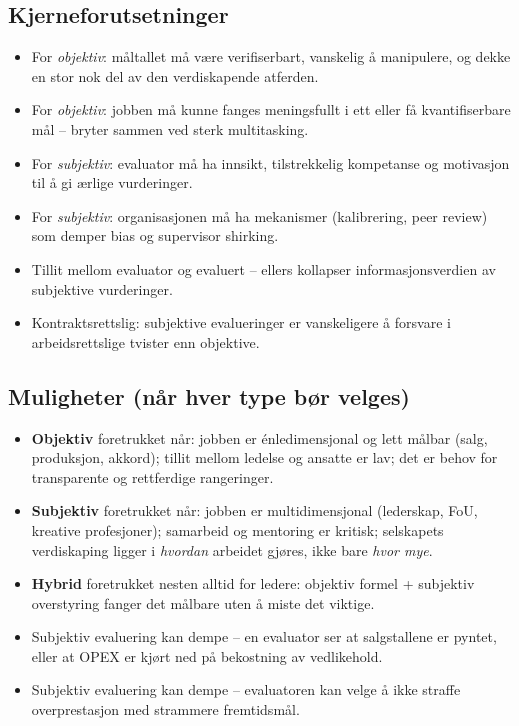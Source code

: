 \subsection*{Kjerneforutsetninger}
\begin{itemize}
\item For \emph{objektiv}: måltallet må være verifiserbart, vanskelig å manipulere, og dekke en stor nok del av den verdiskapende atferden.
\item For \emph{objektiv}: jobben må kunne fanges meningsfullt i ett eller få kvantifiserbare mål -- bryter sammen ved sterk multitasking.
\item For \emph{subjektiv}: evaluator må ha innsikt, tilstrekkelig kompetanse og motivasjon til å gi ærlige vurderinger.
\item For \emph{subjektiv}: organisasjonen må ha mekanismer (kalibrering, peer review) som demper bias og supervisor shirking.
\item Tillit mellom evaluator og evaluert -- ellers kollapser informasjonsverdien av subjektive vurderinger.
\item Kontraktsrettslig: subjektive evalueringer er vanskeligere å forsvare i arbeidsrettslige tvister enn objektive.
\end{itemize}

\subsection*{Muligheter (når hver type bør velges)}
\begin{itemize}
\item \textbf{Objektiv} foretrukket når: jobben er énledimensjonal og lett målbar (salg, produksjon, akkord); tillit mellom ledelse og ansatte er lav; det er behov for transparente og rettferdige rangeringer.
\item \textbf{Subjektiv} foretrukket når: jobben er multidimensjonal (lederskap, FoU, kreative profesjoner); samarbeid og mentoring er kritisk; selskapets verdiskaping ligger i \emph{hvordan} arbeidet gjøres, ikke bare \emph{hvor mye}.
\item \textbf{Hybrid} foretrukket nesten alltid for ledere: objektiv formel + subjektiv overstyring fanger det målbare uten å miste det viktige.
\item Subjektiv evaluering kan dempe  -- en evaluator ser at salgstallene er pyntet, eller at OPEX er kjørt ned på bekostning av vedlikehold.
\item Subjektiv evaluering kan dempe  -- evaluatoren kan velge å ikke straffe overprestasjon med strammere fremtidsmål.
\end{itemize}

